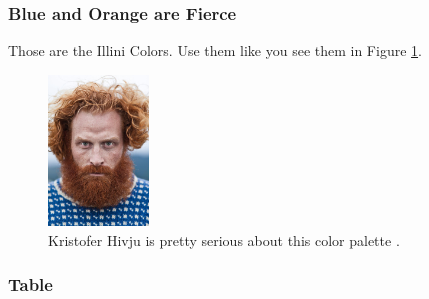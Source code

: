 \begin{frame}
  \frametitle{Blue and Orange are Fierce}
        Those are the Illini Colors. Use them like you see them in Figure
        \ref{fig:fierce}.
  \begin{figure}[htbp!]
    \begin{center}
      \includegraphics[height=4cm]{./images/fierce}
    \end{center}
          \caption{Kristofer Hivju is pretty serious about this color palette \cite{lastname_firstword_1900}.}
    \label{fig:fierce}
  \end{figure}
\end{frame}


\begin{frame}
        \frametitle{Table}
        
\end{frame}


